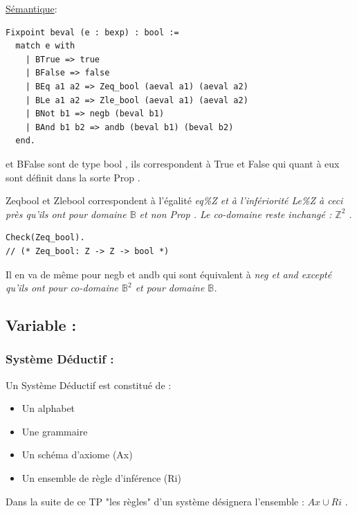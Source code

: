 \documentclass{article}
\begin{document}
\noindent \underline{Sémantique}:

\begin{lstlisting}[style=CStyle]
Fixpoint beval (e : bexp) : bool :=
  match e with
    | BTrue => true
    | BFalse => false
    | BEq a1 a2 => Zeq_bool (aeval a1) (aeval a2)
    | BLe a1 a2 => Zle_bool (aeval a1) (aeval a2)
    | BNot b1 => negb (beval b1)
    | BAnd b1 b2 => andb (beval b1) (beval b2)
  end.
 \end{lstlisting}


\noindent et BFalse sont de type bool , ils correspondent à True et False qui quant à eux sont définit dans la sorte Prop .


\noindent Zeq\textunderscore bool et Zle\textunderscore bool correspondent à l'égalité \it{eq\%Z} et à l'infériorité \it{Le\%Z} à ceci près qu'ils ont pour domaine $\mathbb{B}$ et non Prop . Le co-domaine reste inchangé : $\mathbb{Z}^2$ .  

\begin{lstlisting}[style=CStyle]
Check(Zeq_bool).
// (* Zeq_bool: Z -> Z -> bool *)
\end{lstlisting} 

\noindent Il en va de même pour negb et andb qui sont équivalent à \it{neg}  et \it{and} excepté qu'ils ont pour co-domaine $\mathbb{B}^2$ et pour domaine  $\mathbb{B}$.  


\subsection{ Variable :}



\subsubsection{Système Déductif :}



Un Système Déductif est constitué de :
\begin{itemize}
\item Un alphabet
\item Une grammaire 
\item Un schéma d'axiome (Ax)
\item Un ensemble de règle d'inférence (Ri) 
\end{itemize}

\noindent Dans la suite de ce TP "les règles" d'un système  désignera l'ensemble : $Ax \cup Ri $ .

\medskip
\end{document}
